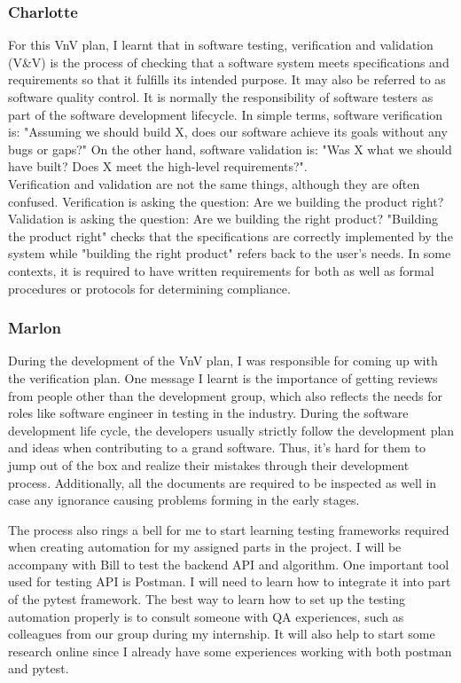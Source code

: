 \documentclass[12pt, titlepage]{article}
\begin{document}
\subsubsection{Charlotte}
For this VnV plan, I learnt that in software testing, verification and validation (V&V) is the process of checking that a software system meets specifications and requirements so that it fulfills its intended purpose. It may also be referred to as software quality control. It is normally the responsibility of software testers as part of the software development lifecycle. In simple terms, software verification is: "Assuming we should build X, does our software achieve its goals without any bugs or gaps?" On the other hand, software validation is: "Was X what we should have built? Does X meet the high-level requirements?".\\

Verification and validation are not the same things, although they are often confused. Verification is asking the question: Are we building the product right?
Validation is asking the question: Are we building the right product? "Building the product right" checks that the specifications are correctly implemented by the system while "building the right product" refers back to the user's needs. In some contexts, it is required to have written requirements for both as well as formal procedures or protocols for determining compliance. 
\newline

\subsubsection{Marlon}
During the development of the VnV plan, I was responsible for coming up with the verification plan. One  message I learnt is the importance of getting reviews from people other than the development group, which also reflects the needs for roles like software engineer in testing in the industry. During the software development life cycle, the developers usually strictly follow the development plan and ideas when contributing to a grand software. Thus, it's hard for them to jump out of the box and realize their mistakes through their development process. Additionally, all the documents are required to be inspected as well in case any ignorance causing problems forming in the early stages. 

The process also rings a bell for me to start learning testing frameworks required when creating automation for my assigned parts in the project. I will be accompany with Bill to test the backend API and algorithm. One important tool used for testing API is Postman. I will need to learn how to integrate it into part of the pytest framework. The best way to learn how to set up the testing automation properly is to consult someone with QA experiences, such as colleagues from our group during my internship. It will also help to start some research online since I already have some experiences working with both postman and pytest.
\end{document}
